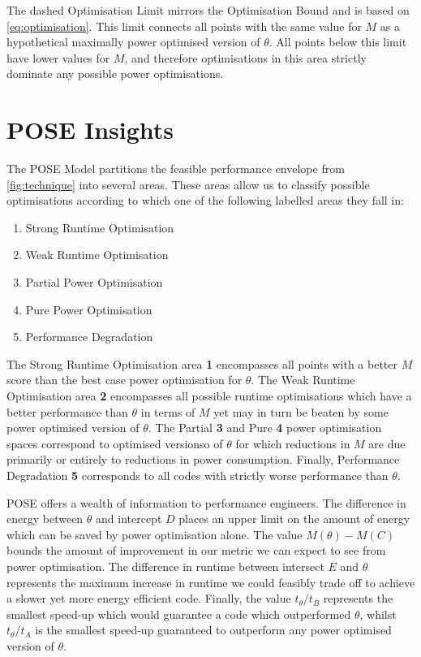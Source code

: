 The dashed Optimisation Limit  mirrors the Optimisation Bound and is based on \autoref{eq:optimisation}. This limit connects all points with the same value for $M$ as a hypothetical maximally power optimised version of $\theta$. 
All points below this limit have lower values for $M$, and therefore optimisations in this area strictly dominate any possible power optimisations. 

\section{POSE Insights}
\label{sec:insights}
The POSE Model partitions the feasible performance envelope from \autoref{fig:technique} into several areas.
These areas allow us to classify possible optimisations according to which one of the following labelled areas they fall in:

\begin{multicols}{2}
\begin{enumerate}
\item Strong Runtime Optimisation
\item Weak Runtime Optimisation
\item Partial Power Optimisation
\item Pure Power Optimisation
\item Performance Degradation \columnbreak
\end{enumerate}
\end{multicols}

The Strong Runtime Optimisation area \textbf{1} encompasses all points with a better $M$ score than the best case power optimisation for $\theta$. The Weak Runtime Optimisation area \textbf{2} encompasses all possible runtime optimisations which have a better performance than $\theta$ in terms of $M$ yet may in turn be beaten by some power optimised version of $\theta$. The Partial \textbf{3} and Pure \textbf{4} power optimisation spaces correspond to optimised versionso of $\theta$ for which reductions in $M$ are due primarily or entirely to reductions in power consumption.
Finally, Performance Degradation \textbf{5} corresponds to all codes with strictly worse performance than $\theta$.

POSE offers a wealth of information to performance engineers.
The difference in energy between $\theta$ and intercept $D$ places an upper limit on the amount of energy which can be saved by power optimisation alone.
The value $M(\theta) - M(C)$ bounds the amount of improvement in our metric we can expect to see from power optimisation.
The difference in runtime between intersect $E$ and $\theta$ represents the maximum increase in runtime we could feasibly trade off to achieve a slower yet more energy efficient code.
Finally, the value $t_\theta / t_B$ represents the smallest speed-up which would guarantee a code which outperformed $\theta$, whilst $t_\theta / t_A$ is the smallest speed-up guaranteed to outperform any power optimised version of $\theta$.

